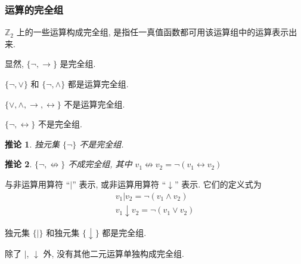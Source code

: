 \documentclass[
    color=black,
    device=normal,
    lang=cn
]{elegantnote}
\newtheorem{deduction}{推论}[subsection]
\begin{document}
\subsubsection{运算的完全组}
\begin{definition}[运算的完全组]
    $\mathbb{Z}_2$ 上的一些运算构成完全组, 是指任一真值函数都可用该运算组中的运算表示出来.
\end{definition}
显然, $\{\lnot,\to\}$ 是完全组.
\begin{proposition}
    $\{\lnot, \lor\}$ 和 $\{\lnot,\land\}$ 都是运算完全组.
\end{proposition}
\begin{proposition}
    $\{\lor,\land,\to,\leftrightarrow\}$ 不是运算完全组.
\end{proposition}
\begin{proposition}
    $\{\lnot,\leftrightarrow\}$ 不是完全组.
\end{proposition}
\begin{deduction}
    独元集 $\{\lnot\}$ 不是完全组.
\end{deduction}
\begin{deduction}
    $\{\lnot,\not\leftrightarrow\}$ 不成完全组, 其中 $v_1\not\leftrightarrow v_2 = \lnot (v_1\leftrightarrow v_2)$
\end{deduction}
\begin{definition}[``与非'' 运算和 ``或非'' 运算]
    与非运算用算符 ``$\vert$'' 表示, 或非运算用算符 ``$\downarrow$'' 表示. 它们的定义式为
    \begin{gather*}
        v_1\vert v_2 = \lnot (v_1\land v_2)\\
        v_1\downarrow v_2 = \lnot (v_1\lor v_2)
    \end{gather*}
\end{definition}
\begin{proposition}
    独元集 $\{\vert\}$ 和独元集 $\{\downarrow\}$ 都是完全组.
\end{proposition}
\begin{proposition}
    除了 $\vert$, $\downarrow$ 外, 没有其他二元运算单独构成完全组.
\end{proposition}
\end{document}
